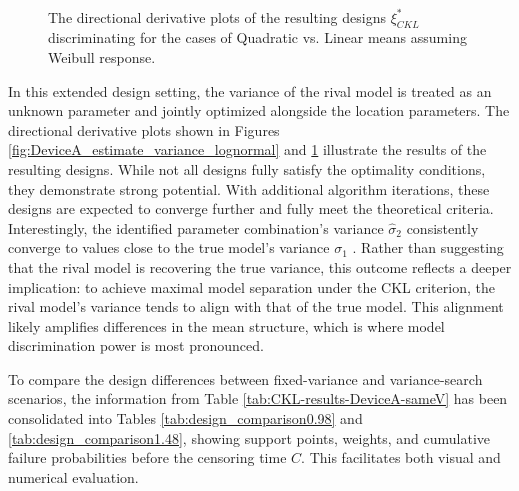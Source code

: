 \begin{itemize}
\begin{enumerate}
\begin{figure}[H]
\centering
{}
 \\
\caption{The directional derivative plots of the resulting designs $\xi^*_{CKL}$ discriminating for the cases of Quadratic vs. Linear means assuming Weibull response.}
\label{fig:DeviceA_estimate_variance_weibull}
\end{figure}

\end{enumerate}

\end{itemize}

\hspace*{8mm} In this extended design setting, the variance of the rival model is treated as an unknown parameter and jointly optimized alongside the location parameters. The directional derivative plots shown in Figures \ref{fig:DeviceA_estimate_variance_lognormal} and \ref{fig:DeviceA_estimate_variance_weibull} illustrate the results of the resulting designs. While not all designs fully satisfy the optimality conditions, they demonstrate strong potential. With additional algorithm iterations, these designs are expected to converge further and fully meet the theoretical criteria. Interestingly, the identified parameter combination's variance $\hat{\sigma}_2$ consistently converge to values close to the true model's variance $\sigma_1$ . Rather than suggesting that the rival model is recovering the true variance, this outcome reflects a deeper implication: to achieve maximal model separation under the CKL criterion, the rival model's variance tends to align with that of the true model. This alignment likely amplifies differences in the mean structure, which is where model discrimination power is most pronounced.

\hspace*{8mm} To compare the design differences between fixed-variance and variance-search scenarios, the information from Table \ref{tab:CKL-results-DeviceA-sameV} has been consolidated into Tables \ref{tab:design_comparison0.98} and \ref{tab:design_comparison1.48}, showing support points, weights, and cumulative failure probabilities before the censoring time $C$. This facilitates both visual and numerical evaluation.

